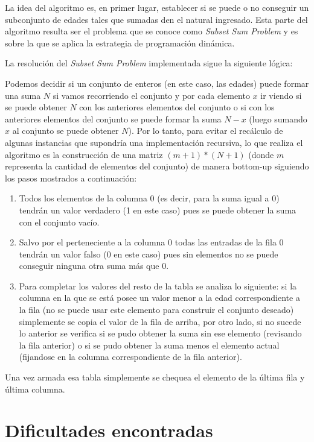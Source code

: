\documentclass[11pt]{article}
\begin{document}
    La idea del algoritmo es, en primer lugar, establecer si se puede o no conseguir un subconjunto de edades tales que sumadas den el natural ingresado. Esta parte del algoritmo resulta ser el problema que se conoce como \emph{Subset Sum Problem} y es sobre la que se aplica la estrategia de programaci\'on din\'amica. 

    La resoluci\'on del \emph{Subset Sum Problem} implementada sigue la siguiente l\'ogica: 

    Podemos decidir si un conjunto de enteros (en este caso, las edades) puede formar una suma $N$ si vamos recorriendo el conjunto y por cada elemento $x$ ir viendo si se puede obtener $N$ con los anteriores elementos del conjunto o si con los anteriores elementos del conjunto se puede formar la suma $N-x$ (luego sumando $x$ al conjunto se puede obtener $N$). Por lo 
    tanto, para evitar el rec\'alculo de algunas instancias que supondr\'ia una implementaci\'on recursiva, lo que realiza el algoritmo es la construcci\'on de una matriz $(m+1)*(N+1)$ (donde $m$ representa la cantidad de elementos del conjunto) de manera bottom-up siguiendo los pasos mostrados a continuaci\'on: 

    \begin{enumerate}
      \item Todos los elementos de la columna 0 (es decir, para la suma igual a 0) tendr\'an un valor verdadero (1 en este caso) pues se puede obtener la suma con el conjunto vac\'io. 
      \item Salvo por el perteneciente a la columna 0 todas las entradas de la fila 0 tendr\'an un valor falso (0 en este caso) pues sin elementos no se puede conseguir ninguna otra suma m\'as que 0. 
      \item Para completar los valores del resto de la tabla se analiza lo siguiente: si la columna en la que se est\'a posee un valor menor a la edad correspondiente a la fila (no se puede usar este elemento para construir el conjunto deseado) simplemente se copia el valor de la fila de arriba, por otro lado, si no sucede lo anterior se verifica si se pudo obtener la suma sin ese elemento (revisando la fila anterior) o si se pudo obtener la suma menos el elemento actual (fijandose en la columna correspondiente de la fila anterior).
    \end{enumerate}

    Una vez armada esa tabla simplemente se chequea el elemento de la \'ultima fila y \'ultima columna.

\section{Dificultades encontradas}
\end{document}
